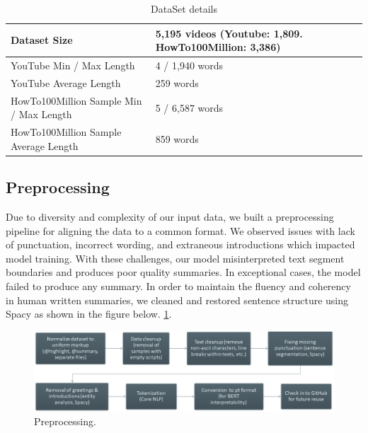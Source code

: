 \documentclass{article}
\begin{document}
\begin{table}[H]
  \caption{DataSet details}
  \label{dataset}
  \centering
  \begin{tabular}{llll}
    \toprule
  Dataset Size  &  5,195 videos (Youtube: 1,809. HowTo100Million: 3,386)    \\
 \midrule   
   YouTube Min / Max Length  &  4 / 1,940 words     \\
\midrule
YouTube Average Length & 259 words    \\
\midrule
  HowTo100Million Sample Min / Max Length & 5 / 6,587 words    \\
\midrule
HowTo100Million Sample Average Length & 859 words   \\
\bottomrule
  \end{tabular}
\end{table}

\subsection{Preprocessing}
\label{Preprocessing}

Due to diversity and complexity of our input data, we built a preprocessing pipeline for aligning the data to a common format. We observed issues with lack of punctuation, incorrect wording, and extraneous introductions which impacted model training. With these challenges, our model misinterpreted text segment boundaries and produces poor quality summaries. In exceptional cases, the model failed to produce any summary. In order to maintain the fluency and coherency in human written summaries, we cleaned and restored sentence structure using Spacy as shown in the figure below. \ref{fig:preprocessing}.

\begin{figure}[H]
  \includegraphics[width=\linewidth]{preprocessing.PNG}
  \caption{Preprocessing.}
  \label{fig:preprocessing}
\end{figure}
\end{document}
